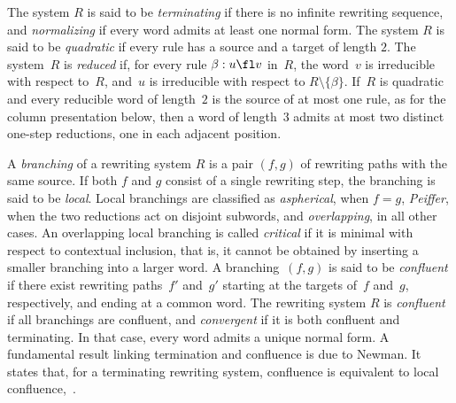 \documentclass[a4paper, twoside, 11pt, english]{article}
\begin{document}
The system $R$ is said to be \emph{terminating} if there is no infinite rewriting sequence,
and \emph{normalizing} if every word admits at least one normal form.
The system $R$ is said to be \emph{quadratic} if every rule has a source and a target of length $2$.
The system~$R$ is \emph{reduced} if, for every rule
$\beta:u\fl v$ in~$R$, the word~$v$ is irreducible with
respect to~$R$, and~$u$ is irreducible with respect to
$R\setminus\{\beta\}$.
If~$R$ is quadratic and every reducible word of length~$2$ is the source of at most one rule, as for the column
presentation below, then a word of length~$3$ admits at most two distinct one-step reductions, one in each adjacent position.

A \emph{branching} of a rewriting system $R$ is a pair $(f,g)$ of rewriting paths with the same source.
If both $f$ and $g$ consist of a single rewriting step, the branching is said to be \emph{local}.
Local branchings are classified as \emph{aspherical}, when $f=g$,  \emph{Peiffer}, when the two reductions act on disjoint subwords, and  \emph{overlapping}, in all other cases.
An overlapping local branching is called \emph{critical} if it is minimal with respect to contextual inclusion,
that is, it cannot be obtained by inserting a smaller branching into a larger word.
A branching~$(f,g)$ is said to be \emph{confluent} if there exist rewriting paths~$f'$ and~$g'$ starting at the targets of~$f$ and~$g$, respectively, and ending at a common word.
The rewriting system $R$ is \emph{confluent} if all branchings are confluent,
and \emph{convergent} if it is both confluent and terminating.
In that case, every word admits a unique normal form. A fundamental result linking termination and confluence is due to Newman.
It states that, for a terminating rewriting system, confluence is equivalent
to local confluence,~\cite{Newman42,BookOtto93}.
\end{document}
